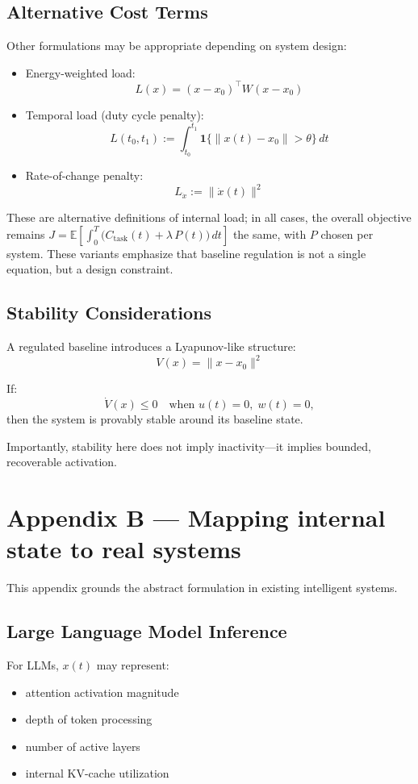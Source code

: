 \documentclass[11pt]{article}
\begin{document}
\subsection{Alternative Cost Terms}
Other formulations may be appropriate depending on system design:

\begin{itemize}
\item Energy-weighted load: 
\[
L(x)=(x-x_0)^{\top}W(x-x_0)
\]
\item Temporal load (duty cycle penalty):
\[
L(t_0,t_1):=\int_{t_0}^{t_1}\mathbf{1}\{\|x(t)-x_0\|>\theta\}\,dt
\]
\item Rate-of-change penalty: 
\[
L_{\dot{x}}:=\|\dot{x}(t)\|^{2}
\]
\end{itemize}

These are alternative definitions of internal load; in all cases, the overall objective remains \(J=\mathbb{E}\!\left[\int_{0}^{T}\big(C_{\mathrm{task}}(t)+\lambda\,P(t)\big)\,dt\right]\) the same, with \(P\) chosen per system. These variants emphasize that baseline regulation is not a single equation, but a design constraint.

\subsection{Stability Considerations}
A regulated baseline introduces a Lyapunov-like structure:
\[
V(x)=\|x-x_0\|^{2}
\]

If:
\[
\dot{V}(x)\le 0 \quad \text{when } u(t)=0,\; w(t)=0,
\]
then the system is provably stable around its baseline state.

Importantly, stability here does not imply inactivity—it implies bounded, recoverable activation.

\section{Appendix B — Mapping internal state to real systems}
This appendix grounds the abstract formulation in existing intelligent systems.

\subsection{Large Language Model Inference}
For LLMs, \(x(t)\) may represent:

\begin{itemize}
\item attention activation magnitude
\item depth of token processing
\item number of active layers
\item internal KV-cache utilization
\end{itemize}
\end{document}
